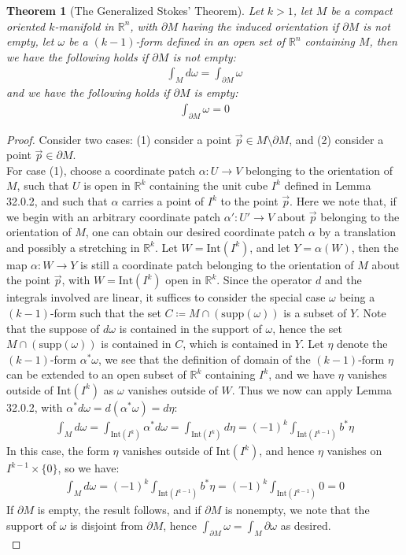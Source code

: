 \documentclass[11pt,oneside]{book}
\theoremstyle{break}
\theoremstyle{break}
\newtheorem{thm}{Theorem}[section]
\newcommand{\R}{\mathbb{R}}
\newcommand{\Int}{\text{Int}}
\newcommand{\supp}{\text{supp}}
\begin{document}
\begin{thm}[The Generalized Stokes' Theorem]
Let $k>1$, let $M$ be a compact oriented $k$-manifold in $\R^n$, with $\partial M$ having the induced orientation if $\partial M$ is not empty, let $\omega$ be a $(k-1)$-form defined in an open set of $\R^n$ containing $M$, then we have the following holds if $\partial M$ is not empty:
\begin{align*}
\int_M d\omega  = \int_{\partial M}\omega
\end{align*}
and we have the following holds if $\partial M$ is empty:
\begin{align*}
\int_{\partial M}\omega = 0
\end{align*}
\end{thm}
\begin{proof}
Consider two cases: (1) consider a point $\vec{p}\in M \setminus \partial M$, and (2) consider a point $\vec{p}\in \partial M$.\\

For case (1), choose a coordinate patch $\alpha:U \to V$ belonging to the orientation of $M$, such that $U$ is open in $\R^k$ containing the unit cube $I^k$ defined in Lemma 32.0.2, and such that $\alpha$ carries a point of $I^k$ to the point $\vec{p}$. Here we note that, if we begin with an arbitrary coordinate patch $\alpha': U' \to V$ about $\vec{p}$ belonging to the orientation of $M$, one can obtain our desired coordinate patch $\alpha$ by a translation and possibly a stretching in $\R^k$. Let $W = \Int(I^k)$, and let $Y = \alpha(W)$, then the map $\alpha:W \to Y$ is still a coordinate patch belonging to the orientation of $M$ about the point $\vec{p}$, with $W = \Int(I^k)$ open in $\R^k$. Since the operator $d$ and the integrals involved are linear, it suffices to consider the special case $\omega$ being a $(k-1)$-form such that the set $C\coloneqq M\cap (\supp(\omega))$ is a subset of $Y$. Note that the suppose of $d\omega$ is contained in the support of $\omega$, hence the set $M\cap (\supp(\omega))$ is contained in $C$, which is contained in $Y$. Let $\eta$ denote the $(k-1)$-form $\alpha^*\omega$, we see that the definition of domain of the $(k-1)$-form $\eta$ can be extended to an open subset of $\R^k$ containing $I^k$, and we have $\eta$ vanishes outside of $\Int(I^k)$ as $\omega$ vanishes outside of $W$. Thus we now can apply Lemma 32.0.2, with $\alpha^*d\omega = d(\alpha^*\omega) = d\eta$:
\begin{align*}
\int_M d\omega = \int_{\Int(I^k)}\alpha^*d\omega = \int_{\Int(I^k)} d\eta = (-1)^k \int_{\Int(I^{k-1})} b^* \eta
\end{align*}
In this case, the form $\eta$ vanishes outside of $\Int(I^k)$, and hence $\eta$ vanishes on $I^{k-1}\times \{0\}$, so we have:
\begin{align*}
\int_M d\omega = (-1)^k \int_{\Int(I^{k-1})} b^* \eta  = (-1)^k \int_{\Int(I^{k-1})}0 = 0
\end{align*}
If $\partial M$ is empty, the result follows, and if $\partial M$ is nonempty, we note that the support of $\omega$ is disjoint from $\partial M$, hence $\int_{\partial M}\omega = \int_M \partial \omega$ as desired.\\


\end{proof}
\end{document}
